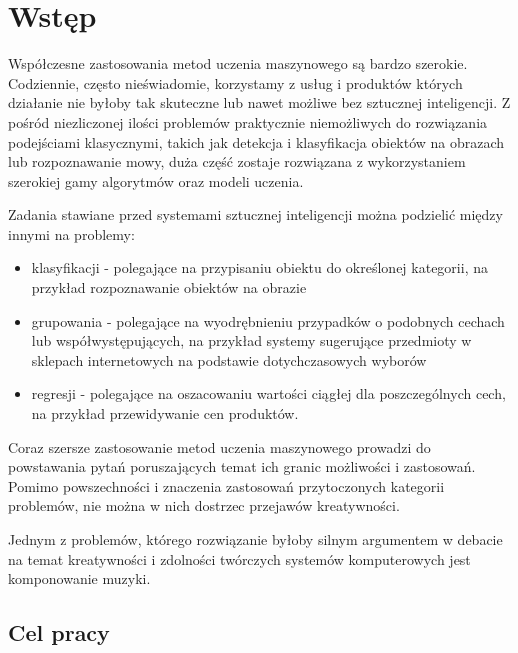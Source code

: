 
\chapter{Wstęp}\label{chap:intro}
{
    Współczesne zastosowania metod uczenia maszynowego są bardzo szerokie. Codziennie, często nieświadomie,
    korzystamy z usług i produktów których działanie nie byłoby tak skuteczne lub nawet możliwe bez sztucznej inteligencji.
    Z pośród niezliczonej ilości problemów praktycznie niemożliwych do rozwiązania podejściami klasycznymi, 
    takich jak detekcja i klasyfikacja obiektów na obrazach lub rozpoznawanie mowy,
    duża część zostaje rozwiązana z wykorzystaniem szerokiej gamy algorytmów oraz modeli uczenia.

    Zadania stawiane przed systemami sztucznej inteligencji można podzielić między innymi na problemy:
    \begin{itemize}
        \setlength\itemsep{-0.5em}
        \item klasyfikacji - polegające na przypisaniu obiektu do określonej kategorii, 
        na przykład rozpoznawanie obiektów na obrazie 
        \item grupowania - polegające na wyodrębnieniu przypadków o podobnych cechach 
        lub współwystępujących, na przykład systemy sugerujące przedmioty w sklepach internetowych na podstawie dotychczasowych wyborów
        \item regresji - polegające na oszacowaniu wartości ciągłej dla poszczególnych cech, 
        na przykład przewidywanie cen produktów.
    \end{itemize}

    \pagebreak

    Coraz szersze zastosowanie metod uczenia maszynowego prowadzi do powstawania pytań poruszających temat 
    ich granic możliwości i zastosowań.
    Pomimo powszechności i znaczenia zastosowań przytoczonych kategorii problemów, nie można w nich dostrzec przejawów kreatywności.
    
    Jednym z problemów, którego rozwiązanie byłoby silnym argumentem w debacie na temat kreatywności i zdolności twórczych
    systemów komputerowych jest komponowanie muzyki.

    \section{Cel pracy}
    {

}}
